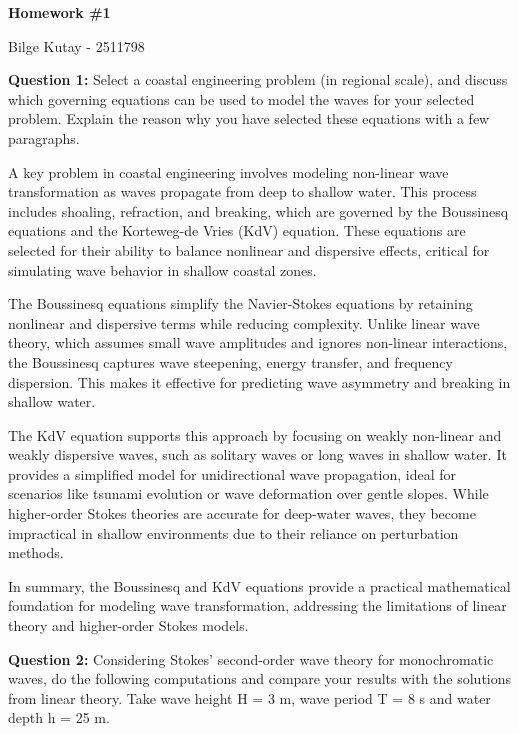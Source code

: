\documentclass[a4paper]{article}
\begin{document}
\begin{center}
\textbf{\large{Homework \#1}}

Bilge Kutay - 2511798
\end{center}

\textbf{Question 1:} Select a coastal engineering problem (in regional scale), and discuss which
governing equations can be used to model the waves for your selected problem. Explain the reason
why you have selected these equations with a few paragraphs.
\vspace{0.3cm}

A key problem in coastal engineering involves modeling non-linear wave transformation as waves propagate from deep to shallow water. This process includes shoaling, refraction, and breaking, which are governed by the Boussinesq equations and the Korteweg-de Vries (KdV) equation. These equations are selected for their ability to balance nonlinear and dispersive effects, critical for simulating wave behavior in shallow coastal zones.\par

The Boussinesq equations simplify the Navier-Stokes equations by retaining nonlinear and dispersive terms while reducing complexity. Unlike linear wave theory, which assumes small wave amplitudes and ignores non-linear interactions, the Boussinesq captures wave steepening, energy transfer, and frequency dispersion. This makes it effective for predicting wave asymmetry and breaking in shallow water.

The KdV equation supports this approach by focusing on weakly non-linear and weakly dispersive waves, such as solitary waves or long waves in shallow water. It provides a simplified model for unidirectional wave propagation, ideal for scenarios like tsunami evolution or wave deformation over gentle slopes. While higher-order Stokes theories are accurate for deep-water waves, they become impractical in shallow environments due to their reliance on perturbation methods.

In summary, the Boussinesq and KdV equations provide a practical mathematical foundation for modeling wave transformation, addressing the limitations of linear theory and higher-order Stokes models. 

\vspace{0.5cm}
\textbf{Question 2:} Considering Stokes’ second-order wave theory for monochromatic waves,
do the following computations and compare your results with the solutions from linear theory. Take
wave height H = 3 m, wave period T = 8 s and water depth h = 25 m.
\vspace{0.3cm}
\end{document}
